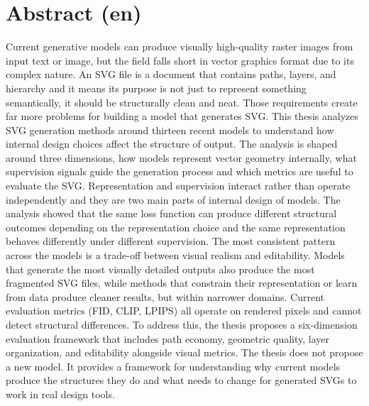 
\section*{Abstract (en)}
Current generative models can produce visually high-quality raster images from input
text or image, but the field falls short in vector graphics format due to its complex
nature. An SVG file is a document that contains paths, layers, and hierarchy and it
means its purpose is not just to represent something semantically, it should be structurally clean and neat. 
Those requirements create far more problems for 
building a model that generates SVG. This thesis analyzes SVG generation methods around thirteen recent models 
to understand how internal design choices affect the structure of output. The analysis is shaped around three dimensions, 
how models represent vector geometry internally, what supervision signals guide the generation process and which metrics 
are useful to evaluate the SVG. Representation and supervision interact rather than operate independently and they are two 
main parts of internal design of models. The analysis showed that the same loss function can produce different structural outcomes 
depending on the representation choice and the same representation behaves differently under different supervision. 
The most consistent pattern across the models is a trade-off between visual realism and editability. Models that generate the 
most visually detailed outputs also produce the most fragmented SVG files, while methods that constrain their representation 
or learn from data produce cleaner results, but within narrower domains. Current evaluation metrics (FID, CLIP, LPIPS) all operate 
on rendered pixels and cannot detect structural differences. To address this, the thesis proposes a six-dimension evaluation 
framework that includes path economy, geometric quality, layer organization, and editability alongside visual metrics. 
The thesis does not propose a new model. It provides a framework for understanding why current models produce the structures 
they do and what needs to change for generated SVGs to work in real design tools.


